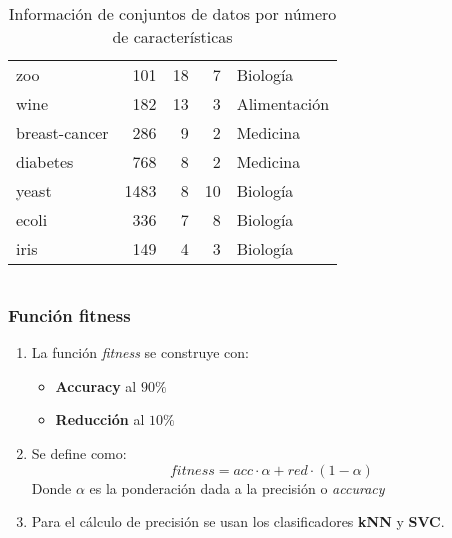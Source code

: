 \begin{frame}
\begin{columns}
\begin{table}[htp]
\begin{tabular}{ l r r r l }
        zoo              & 101            & 18            & 7             & Biología      \\
        wine             & 182            & 13            & 3             & Alimentación  \\
        breast-cancer    & 286            & 9             & 2             & Medicina      \\
        diabetes         & 768            & 8             & 2             & Medicina      \\
        yeast            & 1483           & 8             & 10            & Biología      \\
        ecoli            & 336            & 7             & 8             & Biología      \\
        iris             & 149            & 4             & 3             & Biología      \\ \hline
      \end{tabular}
      \caption{Información de conjuntos de datos por número de características}
      \label{tab:datasets_info}
    \end{table}
  \end{columns}
\end{frame}

\begin{frame}
  \frametitle{Función fitness}
  \begin{enumerate}
    \item La función \textit{fitness} se construye con:
          \begin{itemize}
            \item \textbf{Accuracy} al $90\%$
            \item \textbf{Reducción} al $10\%$
          \end{itemize}
    \item Se define como: \begin{equation}
            fitness = acc\cdot\alpha + red\cdot(1-\alpha)
            \label{eq:fitness}
          \end{equation}
          Donde $\alpha$ es la ponderación dada a la precisión o \textit{accuracy}
    \item Para el cálculo de precisión se usan los clasificadores \textbf{kNN} y \textbf{SVC}.           
  \end{enumerate}
\end{frame}


